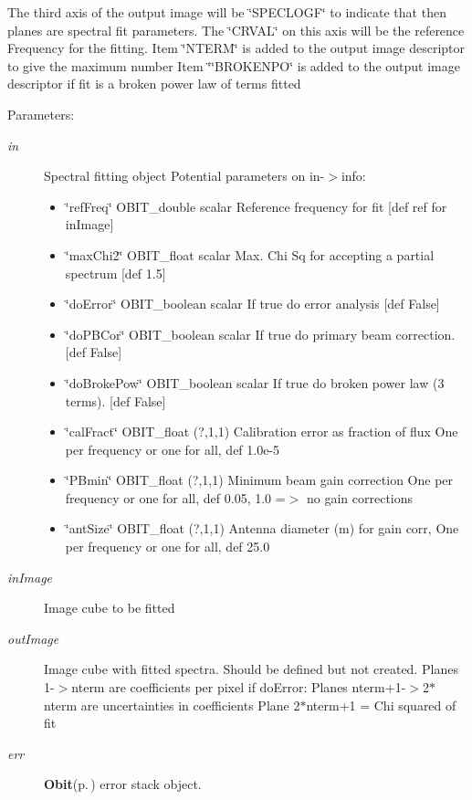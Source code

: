 The third axis of the output image will be \char`\"{}SPECLOGF\char`\"{} to indicate that then planes are spectral fit parameters. The \char`\"{}CRVAL\char`\"{} on this axis will be the reference Frequency for the fitting. Item \char`\"{}NTERM\char`\"{} is added to the output image descriptor to give the maximum number Item \char`\"{}\char`\"{}BROKENPO\char`\"{} is added to the output image descriptor if fit is a broken power law of terms fitted \begin{Desc}
\item[Parameters:]
\begin{description}
\item[{\em in}]Spectral fitting object Potential parameters on in-$>$info: \begin{itemize}
\item \char`\"{}ref\-Freq\char`\"{} OBIT\_\-double scalar Reference frequency for fit [def ref for in\-Image] \item \char`\"{}max\-Chi2\char`\"{} OBIT\_\-float scalar Max. Chi Sq for accepting a partial spectrum [def 1.5] \item \char`\"{}do\-Error\char`\"{} OBIT\_\-boolean scalar If true do error analysis [def False] \item \char`\"{}do\-PBCor\char`\"{} OBIT\_\-boolean scalar If true do primary beam correction. [def False] \item \char`\"{}do\-Broke\-Pow\char`\"{} OBIT\_\-boolean scalar If true do broken power law (3 terms). [def False] \item \char`\"{}cal\-Fract\char`\"{} OBIT\_\-float (?,1,1) Calibration error as fraction of flux One per frequency or one for all, def 1.0e-5 \item \char`\"{}PBmin\char`\"{} OBIT\_\-float (?,1,1) Minimum beam gain correction One per frequency or one for all, def 0.05, 1.0 =$>$ no gain corrections \item \char`\"{}ant\-Size\char`\"{} OBIT\_\-float (?,1,1) Antenna diameter (m) for gain corr, One per frequency or one for all, def 25.0\end{itemize}
\item[{\em in\-Image}]Image cube to be fitted \item[{\em out\-Image}]Image cube with fitted spectra. Should be defined but not created. Planes 1-$>$nterm are coefficients per pixel if do\-Error: Planes nterm+1-$>$2$\ast$nterm are uncertainties in coefficients Plane 2$\ast$nterm+1 = Chi squared of fit \item[{\em err}]{\bf Obit}{\rm (p.\,\pageref{structObit})} error stack object. \end{description}
\end{Desc}
